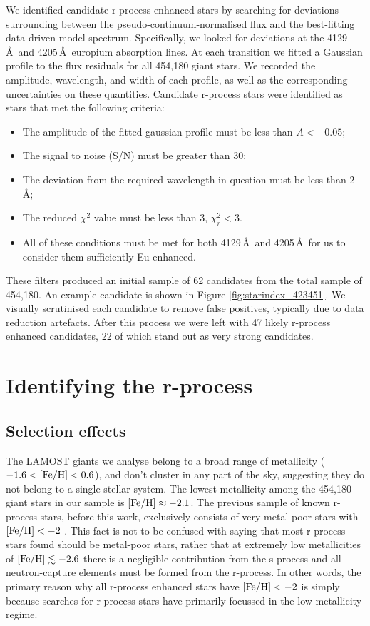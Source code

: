 \documentclass[a4paper,fleqn,usenatbib]{mnras}
\begin{document}
	We identified candidate r-process enhanced stars by searching for deviations surrounding between the pseudo-continuum-normalised flux and the best-fitting data-driven model spectrum. Specifically, we looked for deviations at the 4129\,\AA\ and 4205\,\AA\ europium absorption lines. At each transition we fitted a Gaussian profile to the flux residuals for all 454,180 giant stars. We recorded the amplitude, wavelength, and width of each profile, as well as the corresponding uncertainties on these quantities. 
	Candidate r-process stars were identified as stars that met the following criteria:
	
	\begin{itemize}
		\item The amplitude of the fitted gaussian profile must be less than ${A<-0.05}$;
		\item The signal to noise (S/N) must be greater than 30;
		\item The deviation from the required wavelength in question must be less than 2\,\AA;
		\item The reduced $\chi^{2}$ value must be less than 3, $\chi_r^{2}<3$.
		\item All of these conditions must be met for both 4129\,\AA\ and 4205\,\AA\ for us to consider them sufficiently Eu enhanced.
	\end{itemize}   
	
	These filters produced an initial sample of 62 candidates from the total sample of 454,180. An example candidate is shown in Figure \ref{fig:starindex_423451}. We visually scrutinised each candidate to remove false positives, typically due to data reduction artefacts. After this process we were left with 47 likely r-process enhanced candidates, 22 of which stand out as very strong candidates.
	
	\section{Identifying the r-process}
	
	\subsection{Selection effects}
	The LAMOST giants we analyse belong to a broad range of metallicity ($-1.6 < \rm{[Fe/H]} < 0.6$), and don't cluster in any part of the sky, suggesting they do not belong to a single stellar system. The lowest metallicity among the 454,180 giant stars in our sample is $[{\rm Fe/H}] \approx -2.1$. The previous sample of known r-process stars, before this work, exclusively consists of very metal-poor stars with $[{\rm Fe/H}] < -2$ \citep{Barklem2005}. This fact is not to be confused with saying that most r-process stars found should be metal-poor stars, rather that at extremely low metallicities of $[{\rm Fe/H}] \lesssim -2.6$ \citep{Simmerer2004} there is a negligible contribution from the s-process
	and all neutron-capture elements must be formed from the r-process. In other words, the primary reason why all r-process enhanced stars have $[{\rm Fe/H}] < -2$ is simply because searches for r-process stars have primarily focussed in the low metallicity regime.
	
\end{document}
